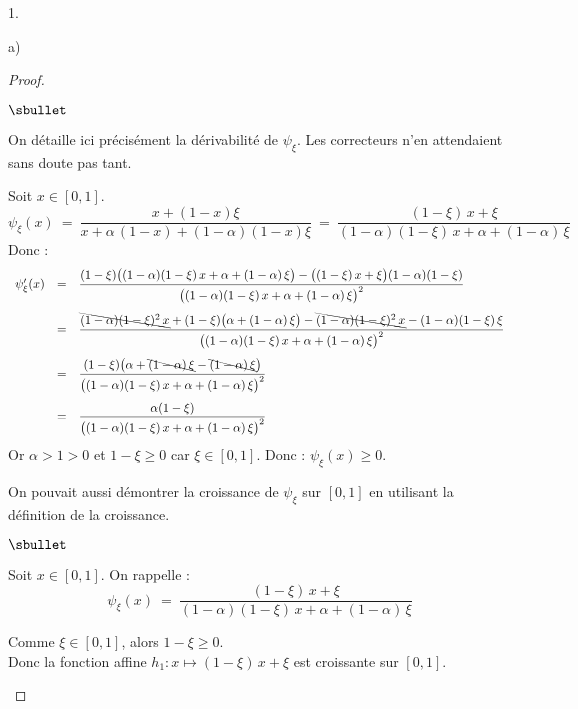 \documentclass[11pt]{article}%
\begin{document}
\begin{noliste}{1.}
\begin{noliste}{a)}
\begin{proof}
\begin{noliste}{$\sbullet$}
	\begin{remark}
	  On détaille ici précisément la dérivabilité de $\psi_\xi$.
	  Les correcteurs n'en attendaient sans doute pas tant.
	\end{remark}

	
	\item Soit $x \in [0,1]$.
	\[
	  \psi_\xi(x) \ = \ 
	  \dfrac{x+ (1-x) \xi}{x + \alpha \, (1-x) + 
	  (1- \alpha)(1-x)\xi}
	  \ = \
	  \dfrac{(1-\xi) \, x + \xi}
	  {(1-\alpha)(1-\xi) \, x + \alpha + (1-\alpha) \, \xi}
	\]
	Donc :
	\[
	  \begin{array}{rcl}
	    \psi_\xi'(x) &=& 
	    \dfrac{(1-\xi)\big((1-\alpha)(1-\xi) \, x + \alpha 
	    + (1-\alpha) \, \xi\big) - \big((1-\xi) \, x + \xi\big)
	    (1-\alpha)(1-\xi)}
	    {\big((1-\alpha)(1-\xi) \, x + \alpha + (1-\alpha) \,
	    \xi\big)^2}
	    \\[.6cm]
	    &=& \dfrac{\bcancel{(1-\alpha)(1-\xi)^2 \, x} + 
	    (1-\xi)\big(\alpha + (1-\alpha) \, \xi\big) - 
	    \bcancel{(1-\alpha)(1-\xi)^2 \, x} - (1-\alpha)(1-\xi)
	    \, \xi}
	    {\big((1-\alpha)(1-\xi) \, x + \alpha + (1-\alpha) \,
	    \xi\big)^2}
	    \\[.6cm]
	    &=& \dfrac{(1-\xi)\big(\alpha + \bcancel{(1-\alpha) \, \xi}
	    - \bcancel{(1-\alpha) \, \xi}\big)}
	    {\big((1-\alpha)(1-\xi) \, x + \alpha + (1-\alpha) \,
	    \xi\big)^2}
	    \\[.6cm]
	    &=& \dfrac{\alpha (1-\xi)}
	    {\big((1-\alpha)(1-\xi) \, x + \alpha + (1-\alpha) \,
	    \xi\big)^2}
	  \end{array}
	\]
	Or $\alpha >1>0$ et $1-\xi \geq 0$ car $\xi \in [0,1]$. Donc :
	$\psi_\xi(x) \geq 0$.
      \end{noliste}
      
      \begin{remark}
        On pouvait aussi démontrer la croissance de $\psi_\xi$ sur 
        $[0,1]$ en utilisant la définition de la croissance.
        \begin{noliste}{$\sbullet$}
	  \item Soit $x \in [0,1]$. On rappelle :
	  \[
	    \psi_\xi(x) \ = \ \dfrac{(1-\xi) \, x + \xi}
	    {(1-\alpha)(1-\xi) \, x + \alpha + (1-\alpha) \, \xi}
	  \]
	  
	  \item Comme $\xi \in [0,1]$, alors $1-\xi \geq 0$.\\
	  Donc la fonction affine $h_1 : x \mapsto (1-\xi) \, x + \xi$ 
	  est croissante sur $[0,1]$.
	  

\end{noliste}
\end{remark}
\end{proof}
\end{noliste}
\end{noliste}
\end{document}
